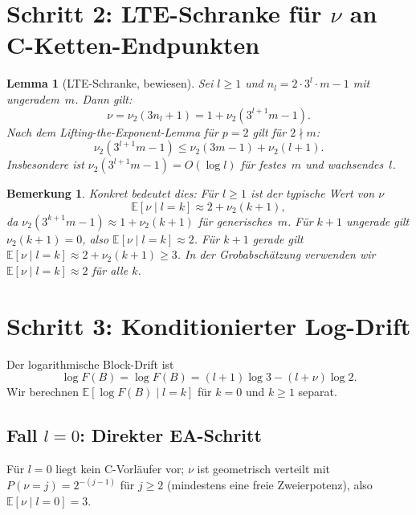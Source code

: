 \documentclass[12pt,a4paper]{article}
\newtheorem{lemma}[definition]{Lemma}
\newtheorem{bemerkung}[definition]{Bemerkung}
\newcommand{\vii}{\nu_2}
\newcommand{\E}{\mathbb{E}}
\newcommand{\logF}{\log F(B)}
\begin{document}
\section{Schritt 2: LTE-Schranke für \texorpdfstring{$\nu$}{nu} an
  C-Ketten-Endpunkten}
\label{sec:lte}

\begin{lemma}[LTE-Schranke, bewiesen]
\label{lem:lte}
Sei $l \geq 1$ und $n_l = 2 \cdot 3^l \cdot m - 1$ mit ungeradem~$m$.
Dann gilt:
\[
  \nu = \vii(3n_l + 1) = 1 + \vii(3^{l+1} m - 1).
\]
Nach dem Lifting-the-Exponent-Lemma für $p=2$ gilt für $2 \nmid m$:
\[
  \vii(3^{l+1} m - 1) \leq \vii(3m-1) + \vii(l+1).
\]
Insbesondere ist $\vii(3^{l+1}m-1) = O(\log l)$ für festes~$m$ und
wachsendes~$l$.
\end{lemma}

\begin{bemerkung}
Konkret bedeutet dies: Für $l \geq 1$ ist der typische Wert von $\nu$
\[
  \E[\nu \mid l=k] \approx 2 + \vii(k+1),
\]
da $\vii(3^{k+1}m-1) \approx 1 + \vii(k+1)$ für generisches~$m$.
Für $k+1$ ungerade gilt $\vii(k+1) = 0$, also $\E[\nu \mid l=k] \approx 2$.
Für $k+1$ gerade gilt $\E[\nu \mid l=k] \approx 2 + \vii(k+1) \geq 3$.
In der Grobabschätzung verwenden wir $\E[\nu \mid l=k] \approx 2$ für alle $k$.
\end{bemerkung}

\section{Schritt 3: Konditionierter Log-Drift}
\label{sec:konditionierter_drift}

Der logarithmische Block-Drift ist
\[
  \logF = \log F(B) = (l+1)\log 3 - (l+\nu)\log 2.
\]
Wir berechnen $\E[\logF \mid l=k]$ für $k = 0$ und $k \geq 1$ separat.

\subsection{Fall \texorpdfstring{$l=0$}{l=0}: Direkter EA-Schritt}

Für $l=0$ liegt kein C-Vorläufer vor; $\nu$ ist geometrisch verteilt
mit $P(\nu=j) = 2^{-(j-1)}$ für $j \geq 2$ (mindestens eine freie
Zweierpotenz), also $\E[\nu \mid l{=}0] = 3$.
\end{document}
